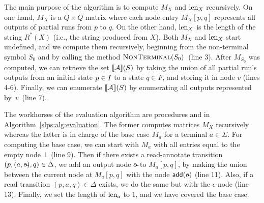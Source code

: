 The main purpose of the algorithm is to compute $M_X$ and $\operatorname{len}_X$ recursively. On one hand, $M_X$ is a $Q\times Q$ matrix where each node entry $M_X[p,q]$ represents all outputs of partial runs from $p$ to $q$. On the other hand, $\operatorname{len}_X$ is the length of the string $R^*(X)$ (i.e., the string produced from $X$). Both $M_X$ and $\operatorname{len}_X$ start undefined, and we compute them recursively, beginning from the non-terminal symbol $S_0$ and by calling the method $\textproc{NonTerminal}(S_0)$~(line 3). After $M_{S_0}$ was computed, we can retrieve the set ${\llbracket{\mathcal{A}}\rrbracket}(S)$ by taking the union of all partial run's outputs from an initial state $p\in I$ to a state $q \in F$, and storing it in node $v$ (lines 4-6). Finally, we can enumerate  ${\llbracket{\mathcal{A}}\rrbracket}(S)$ by enumerating all outputs represented by~$v$~(line 7). 

The workhorses of the evaluation algorithm are procedures  and  in Algorithm~\ref{slps:alg:evaluation}. The former computes matrices $M_X$ recursively whereas the latter is in charge of the base case $M_a$ for a terminal $a \in \Sigma$. For computing the base case, we can start with $M_a$ with all entries equal to the empty node $\bot$ (line 9). Then if there exists a read-annotate transition $(p, (a, \oout), q) \in \Delta$, we add an output node $\oout$ to $M_a[p,q]$, by making the union between the current node at $M_a[p,q]$ with the node $\add(\oout)$ (line 11). Also, if a read transition $(p, a, q) \in \Delta$ exists, we do the same but with the $\epsilon$-node (line 13). Finally, we set the length of $\operatorname{len}_a$ to $1$, and we have covered the base case. 

